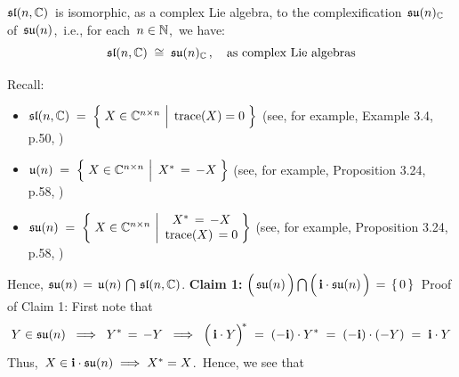 \vskip 0.5cm
\begin{proposition}
\mbox{}
\vskip 0.05cm
\noindent
$\mathfrak{sl}(n,\mathbb{C})$\, is isomorphic, as a complex Lie algebra,
to the complexification \,$\mathfrak{su}(n)_{\mathbb{C}}$\, of \,$\mathfrak{su}(n)$,\,
i.e., for each \,$n \in \mathbb{N}$,\, we have: 
\begin{equation*}
\mathfrak{sl}(n,\mathbb{C}) \;\cong\; \mathfrak{su}(n)_{\mathbb{C}}\,,
\quad
\textnormal{as complex Lie algebras}
\end{equation*}
\end{proposition}
\proof
Recall:
\begin{itemize}
\item
    $
    \sl(n,\C)
    \; = \;
        \left\{\;
            X \in \C^{n \times n}
            \,\left\vert\;\,
            \overset{{\color{white}.}}{\trace(X) = 0}
            \right.
            \,\right\}
    $
    \quad
    (see, for example, Example 3.4, p.50, \cite{Hall2015})
\item
    $
    \mathfrak{u}(n)
    \; = \;
        \left\{\;
            X \in \C^{n \times n}
            \,\left\vert\;\,
            \overset{{\color{white}.}}{X^{*} \,=\, -X}
            \right.
            \,\right\}
    $
    \quad
    (see, for example, Proposition 3.24, p.58, \cite{Hall2015})
\item
    $
    \mathfrak{su}(n)
    \; = \;
        \left\{\;
            X \in \mathbb{C}^{n \times n}
            \,\left\vert
            \begin{array}{c}
                X^{*} \,=\, -X
                \\
                \textnormal{trace}(X) \,= 0
                \end{array}
            \right.
            \!\!\right\}
    $
    \quad
    (see, for example, Proposition 3.24, p.58, \cite{Hall2015})
\end{itemize}
Hence,
\;$
\mathfrak{su}(n) \,=\, \mathfrak{u}(n) \,\bigcap\, \mathfrak{sl}(n,\mathbb{C})
$.\;
\vskip 0.5cm
\noindent
\textbf{Claim 1:}\;
$
\left(\,\overset{{\color{white}.}}{\su(n)}\,\right)
\bigcap
\left(\,\overset{{\color{white}.}}{\i\cdot\su(n)}\,\right)
\, = \,
    \{\,0\,\}
$\,
\vskip 0.1cm
\noindent
Proof of Claim 1:\;
First note that
\begin{equation*}
Y \in \su(n)
\;\;\Longrightarrow\;\;
    Y^{*} \, = \, -Y
\;\;\Longrightarrow\;\;
    \left(\,\overset{{\color{white}.}}{\i \cdot Y}\right)^{\!*}
    \; = \;
    (-\i) \cdot Y^{*}
    \; = \;
    (-\i) \cdot (-Y)
    \; = \;
    \i \cdot Y
\end{equation*}
Thus,
\,$X \in \mathbf{i} \cdot \mathfrak{su}(n) \;\Longrightarrow\; X^{*} = X$.\,
Hence, we see that 
